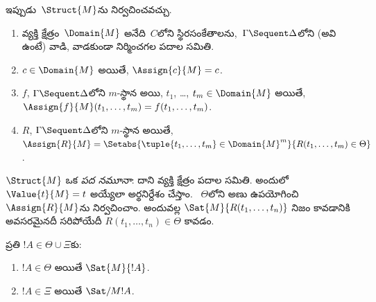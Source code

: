 \documentclass[../../../include/open-logic-section]{subfiles}
\begin{document}
ఇప్పుడు~$\Struct{M}$ను నిర్వచించవచ్చు.
\begin{enumerate}
\item వ్యక్తి క్షేత్రం~$\Domain{M}$ అనేది~$C$లోని స్థిరసంకేతాలను,~$\Gamma \Sequent \Delta$లోని  (అవి ఉంటే) వాడి,  వాడకుండా నిర్మించగల పదాల సమితి.
\item $c \in \Domain{M}$ అయితే, $\Assign{c}{M} = c$.
\item $f$, $\Gamma \Sequent \Delta$లోని $m$-స్థాన  అయి, $t_1$, \dots, $t_m \in \Domain{M}$ అయితే, $\Assign{f}{M}(t_1, \dots, t_m) =
f(t_1, \dots, t_m)$.
\item $R$, $\Gamma \Sequent
\Delta$లోని $m$-స్థాన  అయితే, $\Assign{R}{M} = \Setabs{\tuple{t_1, \dots, t_m} \in
\Domain{M}^m}{R(t_1, \dots, t_m) \in \Theta}$.
\end{enumerate}
$\Struct{M}$ ఒక \emph{పద నమూనా}: దాని వ్యక్తి క్షేత్రం పదాల సమితి. అందులో   $\Value{t}{M} = t$ అయ్యేలా అర్థనిర్దేశం చేస్తాం. ~$\Theta$లోని అణు  ఉపయోగించి $\Assign{R}{M}$ను నిర్వచించాం. అందువల్ల $\Sat{M}{R(t_1, \dots, t_n)}$ నిజం కావడానికి అవసరమైనదీ సరిపోయేదీ $R(t_1, \dots, t_n)
\in \Theta$ కావడం.

\begin{lem}
ప్రతి $!A \in \Theta \cup \Xi$కు:
\begin{enumerate}
  \item $!A \in \Theta$ అయితే $\Sat{M}{!A}$.
  \item $!A \in \Xi$ అయితే $\Sat/{M}{!A}$.
\end{enumerate}
\end{lem}
\end{document}
